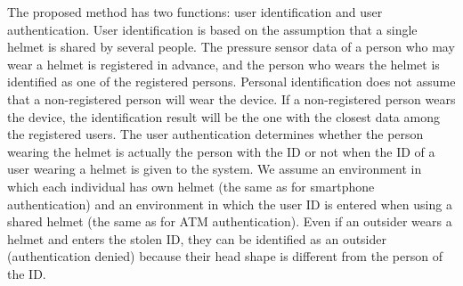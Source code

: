\documentclass[sigchi,authordraft]{acmart}
\begin{document}
The proposed method has two functions: user identification and user authentication. User identification is based on the assumption that a single helmet is shared by several people. The pressure sensor data of a person who may wear a helmet is registered in advance, and the person who wears the helmet is identified as one of the registered persons. Personal identification does not assume that a non-registered person will wear the device. If a non-registered person wears the device, the identification result will be the one with the closest data among the registered users.
The user authentication determines whether the person wearing the helmet is actually the person with the ID or not when the ID of a user wearing a helmet is given to the system. We assume an environment in which each individual has own helmet (the same as for smartphone authentication) and an environment in which the user ID is entered when using a shared helmet (the same as for ATM authentication). Even if an outsider wears a helmet and enters the stolen ID, they can be identified as an outsider (authentication denied) because their head shape is different from the person of the ID.




\end{document}
